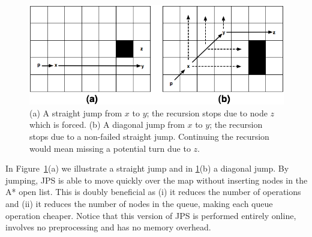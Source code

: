 \begin{figure}[tb]
       \begin{center}
		   \includegraphics[width=0.95\columnwidth]
			{diagrams/jumping.png}
       \end{center}
	\vspace{-3pt}
       \caption{(a) A straight jump from $x$ to $y$; the recursion stops due to node $z$ which is forced.
(b) A diagonal jump from $x$ to $y$; the recursion stops due to a non-failed straight jump. Continuing the recursion
would mean missing a potential turn due to $z$.}
       \label{fig:jumping}
\end{figure}

In Figure~\ref{fig:jumping}(a) we illustrate a straight jump and in \ref{fig:jumping}(b) a diagonal jump. 
By jumping, JPS is able to move quickly over the map 
without inserting nodes in the A* open list.
This is doubly beneficial as (i) it reduces the number of operations 
and (ii) it reduces the number of nodes in the queue, 
making each queue operation cheaper.  
Notice that this version of JPS is performed entirely online, involves no preprocessing and has no memory overhead.  

